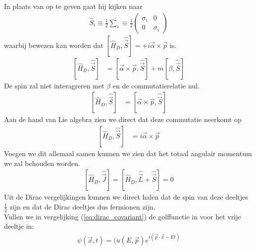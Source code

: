 \documentclass[../main.tex]{subfiles}
\begin{document}
In plaats van op te geven gaat hij kijken naar
\begin{equation}
    \begin{aligned}
        \label{eq:dirac_S}
        \hat{S}_i \equiv \frac{1}{2} \hat{\sum}_i \equiv \frac{1}{2}
        \begin{pmatrix}
            \sigma_i & 0 \\
            0 & \sigma_i
        \end{pmatrix}
    \end{aligned}
\end{equation}
waarbij bewezen kan worden dat $[\hat{H}_D,\hat{\vec{S}}]=+i\vec{\alpha}\times\vec{p}$ is.
\begin{equation}
    \begin{aligned}
        \label{eq:bewijs_H_S_1}
        [\hat{H}_D,\hat{\vec{S}}] &= [\vec{\alpha}\times\vec{p},\hat{\vec{S}}] +m[\beta, \hat{\vec{S}}]
    \end{aligned}
\end{equation}
De spin zal niet interagreren met $\beta$ en de commutatierelatie nul.
\begin{equation}
    \begin{aligned}
        \label{eq:bewijs_H_S_2}
        [\hat{H}_D,\hat{\vec{S}}] &= [\vec{\alpha}\times\vec{p},\hat{\vec{S}}]
    \end{aligned}
\end{equation}
Aan de hand van Lie algebra zien we direct dat deze commutatie neerkomt op
\begin{equation}
    \begin{aligned}
        \label{eq:bewijs_H_S_2}
        [\hat{H}_D,\hat{\vec{S}}] &= i\vec{\alpha} \times \vec{p}
    \end{aligned}
\end{equation}
Voegen we dit allemaal samen kunnen we zien dat het totaal angulair momentum we zal behouden worden.
\begin{equation}
    \begin{aligned}
        \label{eq:H_J}
        [\hat{H}_D,\hat{\vec{J}}] = [\hat{H}_D,\hat{\vec{L}}+\hat{\vec{S}}] = 0
    \end{aligned}
\end{equation}
Uit de Dirac vergelijkingen kunnen we direct halen dat de spin van deze deeltjes $\frac{1}{2}$ zijn en dat de Dirac deeltjes dus fermionen zijn.\\
Vullen we in vergelijking (\ref{eq:dirac_covariant}) de golffunctie in voor het vrije deeltje in:
\begin{equation}
    \begin{aligned}
        \label{eq:dirac_vrij_golf}
        \psi(\vec{x},t)=(u(E,\vec{p})e^{i(\vec{p}\cdot\vec{x} -Et)}
    \end{aligned}
\end{equation}
\end{document}
